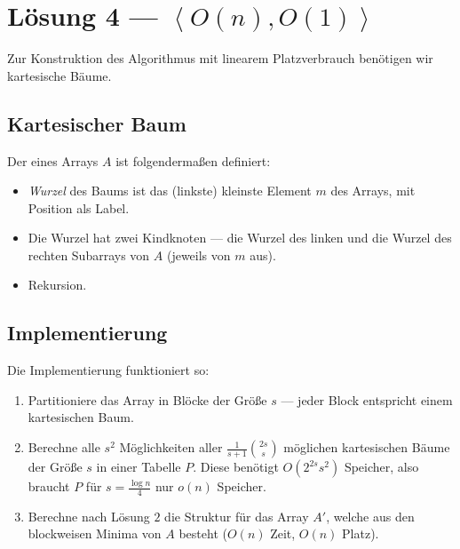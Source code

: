 \section{Lösung 4 --- \( \left\langle O(n),O(1) \right\rangle \)}

Zur Konstruktion des Algorithmus mit linearem Platzverbrauch benötigen wir kartesische Bäume.

\subsection{Kartesischer Baum}

Der  eines Arrays \( A \) ist folgendermaßen definiert:

\begin{itemize}
  \item \emph{Wurzel} des Baums ist das (linkste) kleinste Element \( m \) des Arrays, mit Position als Label.
  \item Die Wurzel hat zwei Kindknoten --- die Wurzel des linken und die Wurzel des rechten Subarrays von \( A \) (jeweils von \( m \) aus).
  \item Rekursion.
\end{itemize}

\subsection{Implementierung}

Die Implementierung funktioniert so:

\begin{enumerate}
  \item Partitioniere das Array in Blöcke der Größe \( s \) --- jeder Block entspricht einem kartesischen Baum.
  \item Berechne alle \( s^2 \) Möglichkeiten aller \( \frac{1}{s+1} \binom{2s}{s} \) möglichen kartesischen Bäume der Größe \( s \) in einer Tabelle \( P \). Diese benötigt \( O(2^{2s}s^2) \) Speicher, also braucht \( P \) für \( s = \frac{\log n}{4} \) nur \( o(n) \) Speicher.
  \item Berechne nach Lösung \( 2 \) die Struktur für das Array \( A' \), welche aus den blockweisen Minima von \( A \) besteht (\( O(n) \) Zeit, \( O(n) \) Platz).
\end{enumerate}
